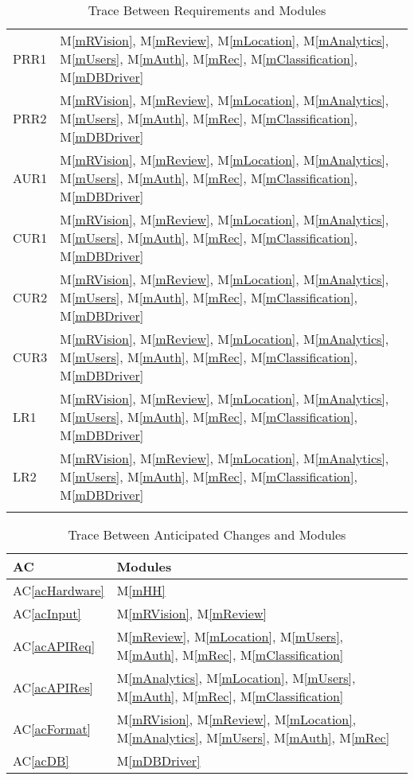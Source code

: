 \documentclass[12pt, titlepage]{article}
\newcommand{\acref}[1]{AC\ref{#1}}
\newcommand{\mref}[1]{M\ref{#1}}
\begin{document}
\begin{longtable}{p{} p{}}
PRR1 & \mref{mRVision}, \mref{mReview}, \mref{mLocation}, \mref{mAnalytics}, \mref{mUsers}, \mref{mAuth}, \mref{mRec}, \mref{mClassification}, \mref{mDBDriver}\\
PRR2 & \mref{mRVision}, \mref{mReview}, \mref{mLocation}, \mref{mAnalytics}, \mref{mUsers}, \mref{mAuth}, \mref{mRec}, \mref{mClassification}, \mref{mDBDriver}\\
AUR1 & \mref{mRVision}, \mref{mReview}, \mref{mLocation}, \mref{mAnalytics}, \mref{mUsers}, \mref{mAuth}, \mref{mRec}, \mref{mClassification}, \mref{mDBDriver}\\
CUR1 & \mref{mRVision}, \mref{mReview}, \mref{mLocation}, \mref{mAnalytics}, \mref{mUsers}, \mref{mAuth}, \mref{mRec}, \mref{mClassification}, \mref{mDBDriver}\\
CUR2 & \mref{mRVision}, \mref{mReview}, \mref{mLocation}, \mref{mAnalytics}, \mref{mUsers}, \mref{mAuth}, \mref{mRec}, \mref{mClassification}, \mref{mDBDriver}\\
CUR3 & \mref{mRVision}, \mref{mReview}, \mref{mLocation}, \mref{mAnalytics}, \mref{mUsers}, \mref{mAuth}, \mref{mRec}, \mref{mClassification}, \mref{mDBDriver}\\
LR1 & \mref{mRVision}, \mref{mReview}, \mref{mLocation}, \mref{mAnalytics}, \mref{mUsers}, \mref{mAuth}, \mref{mRec}, \mref{mClassification}, \mref{mDBDriver}\\
LR2 & \mref{mRVision}, \mref{mReview}, \mref{mLocation}, \mref{mAnalytics}, \mref{mUsers}, \mref{mAuth}, \mref{mRec}, \mref{mClassification}, \mref{mDBDriver}\\
\bottomrule
\caption{Trace Between Requirements and Modules}
\label{TblRT}
\end{longtable}

\begin{table}[H]
\centering
\begin{tabular}{p{} p{}}
\toprule
\textbf{AC} & \textbf{Modules}\\
\midrule
\acref{acHardware} & \mref{mHH}\\
\acref{acInput} & \mref{mRVision}, \mref{mReview}\\
\acref{acAPIReq} & \mref{mReview}, \mref{mLocation}, \mref{mUsers}, \mref{mAuth}, \mref{mRec}, \mref{mClassification}\\
\acref{acAPIRes} & \mref{mAnalytics}, \mref{mLocation}, \mref{mUsers}, \mref{mAuth}, \mref{mRec}, \mref{mClassification}\\
\acref{acFormat} & \mref{mRVision}, \mref{mReview}, \mref{mLocation}, \mref{mAnalytics}, \mref{mUsers}, \mref{mAuth}, \mref{mRec}\\
\acref{acDB} & \mref{mDBDriver}\\
\bottomrule
\end{tabular}
\caption{Trace Between Anticipated Changes and Modules}
\label{TblACT}
\end{table}
\end{document}
